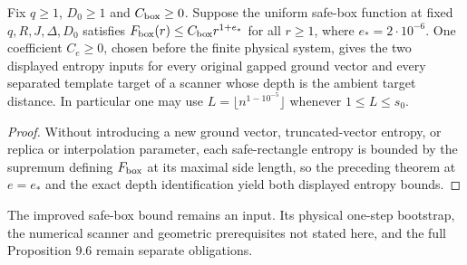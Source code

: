 \begin{lemma}
    \label{thm:template-final-source-entropy}
    \leanok
    Fix $q\geq1$, $D_0\geq1$ and $C_{\rm box}\geq0$.  Suppose the
    uniform safe-box function at fixed $q,R,J,\Delta,D_0$ satisfies
    $F_{\rm box}(r)\leq C_{\rm box}r^{1+e_*}$ for all $r\geq1$,
    where $e_*=2\cdot10^{-6}$.
    One coefficient $C_e\geq0$, chosen before the finite physical system,
    gives the two displayed entropy inputs for every original gapped
    ground vector and every separated template target of a scanner whose
    depth is the ambient target distance.  In particular one may
    use $L=\lfloor n^{1-10^{-5}}\rfloor$ whenever $1\leq L\leq s_0$.
\end{lemma}

\begin{proof}
    \leanok
    Without introducing a new ground vector, truncated-vector entropy, or
    replica or interpolation parameter, each safe-rectangle entropy is bounded
    by the supremum defining $F_{\rm box}$ at its maximal side length, so the
    preceding theorem at $e=e_*$ and the exact depth identification yield both
    displayed entropy bounds.
\end{proof}

The improved safe-box bound remains an input.  Its physical one-step
bootstrap, the numerical scanner and geometric prerequisites not stated
here, and the full Proposition 9.6 remain separate obligations.
